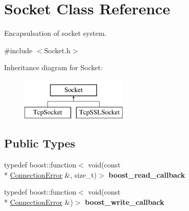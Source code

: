 \hypertarget{class_socket}{\section{Socket Class Reference}
\label{class_socket}
}


Encapsulsation of socket system.  




{\ttfamily \#include $<$Socket.\-h$>$}

Inheritance diagram for Socket\-:\begin{figure}[H]
\begin{center}
\leavevmode
\includegraphics[height=2.000000cm]{class_socket}
\end{center}
\end{figure}
\subsection*{Public Types}
\begin{DoxyCompactItemize}
\item 
\hypertarget{class_socket_a5cf0c0c4e1738aa7dbbf0d653835dfbb}{typedef boost\-::function$<$ void(const \\*
\hyperlink{_connection_error_8h_a3eb2ebd912cc5460d23e45f7188a0a86}{Connection\-Error} \&, size\-\_\-t)$>$ {\bfseries boost\-\_\-read\-\_\-callback}}\label{class_socket_a5cf0c0c4e1738aa7dbbf0d653835dfbb}

\item 
\hypertarget{class_socket_ab219adabe2cd414b563dc40547c4a575}{typedef boost\-::function$<$ void(const \\*
\hyperlink{_connection_error_8h_a3eb2ebd912cc5460d23e45f7188a0a86}{Connection\-Error} \&)$>$ {\bfseries boost\-\_\-write\-\_\-callback}}\label{class_socket_ab219adabe2cd414b563dc40547c4a575}

\end{DoxyCompactItemize}
